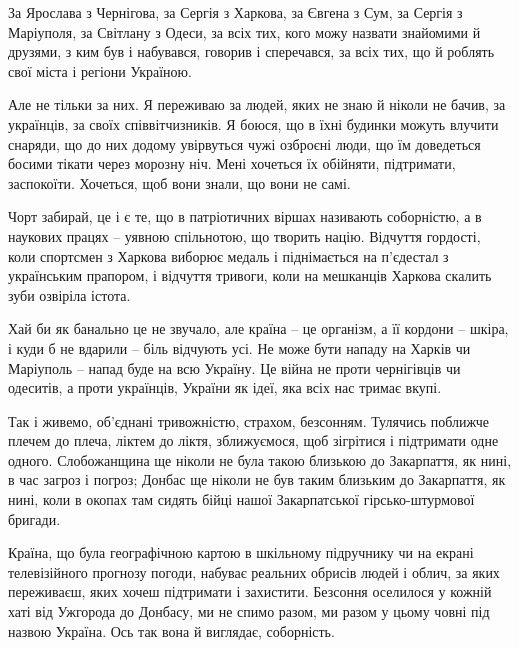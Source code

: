За Ярослава з Чернігова, за Сергія з Харкова, за Євгена з Сум, за Сергія з
Маріуполя, за Світлану з Одеси, за всіх тих, кого можу назвати знайомими й
друзями, з ким був і набувався, говорив і сперечався, за всіх тих, що й роблять
свої міста і регіони Україною.

Але не тільки за них. Я переживаю за людей, яких не знаю й ніколи не бачив, за
українців, за своїх співвітчизників. Я боюся, що в їхні будинки можуть влучити
снаряди, що до них додому увірвуться чужі озброєні люди, що їм доведеться
босими тікати через морозну ніч. Мені хочеться їх обійняти, підтримати,
заспокоїти. Хочеться, щоб вони знали, що вони не самі.

Чорт забирай, це і є те, що в патріотичних віршах називають соборністю, а в
наукових працях – уявною спільнотою, що творить націю. Відчуття гордості, коли
спортсмен з Харкова виборює медаль і піднімається на п’єдестал з українським
прапором, і відчуття тривоги, коли на мешканців Харкова скалить зуби озвіріла
істота.
 
Хай би як банально це не звучало, але країна – це організм, а її кордони –
шкіра, і куди б не вдарили – біль відчують усі. Не може бути нападу на Харків
чи Маріуполь – напад буде на всю Україну. Це війна не проти чернігівців чи
одеситів, а проти українців, України як ідеї, яка всіх нас тримає вкупі.  

Так і живемо, об’єднані тривожністю, страхом, безсонням. Тулячись поближче
плечем до плеча, ліктем до ліктя, зближуємося, щоб зігрітися і підтримати одне
одного. Слобожанщина ще ніколи не була такою близькою до Закарпаття, як нині, в
час загроз і погроз; Донбас ще ніколи не був таким близьким до Закарпаття, як
нині, коли в окопах там сидять бійці нашої Закарпатської гірсько-штурмової
бригади.

Країна, що була географічною картою в шкільному підручнику чи на екрані
телевізійного прогнозу погоди, набуває реальних обрисів людей і облич, за яких
переживаєш, яких хочеш підтримати і захистити. Безсоння оселилося у кожній хаті
від Ужгорода до Донбасу, ми не спимо разом, ми разом у цьому човні під назвою
Україна. Ось так вона й виглядає, соборність.

 
